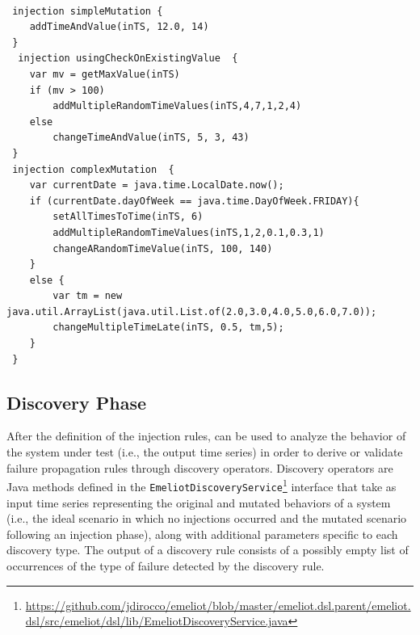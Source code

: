 \begin{lstlisting}[style=JavaStyle,caption=Specification of the injections.,label=lst:injections]

 injection simpleMutation {
 	addTimeAndValue(inTS, 12.0, 14)
 }
  injection usingCheckOnExistingValue  {
 	var mv = getMaxValue(inTS)
 	if (mv > 100)
 		addMultipleRandomTimeValues(inTS,4,7,1,2,4)
 	else
 		changeTimeAndValue(inTS, 5, 3, 43)
 }
 injection complexMutation  {
 	var currentDate = java.time.LocalDate.now();
 	if (currentDate.dayOfWeek == java.time.DayOfWeek.FRIDAY){
		setAllTimesToTime(inTS, 6)
		addMultipleRandomTimeValues(inTS,1,2,0.1,0.3,1)
 		changeARandomTimeValue(inTS, 100, 140)
 	}
 	else {
 		var tm = new java.util.ArrayList(java.util.List.of(2.0,3.0,4.0,5.0,6.0,7.0));
 		changeMultipleTimeLate(inTS, 0.5, tm,5);
 	}
 }
\end{lstlisting}

\subsection{Discovery Phase}
\label{sec:discovery}
After the definition of the injection rules, \tool can be used to analyze the behavior of the system under test (i.e., the output time series) in order to derive or validate failure propagation rules through discovery operators. 
Discovery operators are Java methods defined in the \texttt{EmeliotDiscoveryService}\footnote{\url{https://github.com/jdirocco/emeliot/blob/master/emeliot.dsl.parent/emeliot.dsl/src/emeliot/dsl/lib/EmeliotDiscoveryService.java}} interface that take as input time series representing the original and mutated behaviors of a system (i.e., the ideal scenario in which no injections occurred and the mutated scenario following an injection phase), along with additional parameters specific to each discovery type. The output of a discovery rule consists of a possibly empty list of occurrences of the type of failure detected by the discovery rule. %

